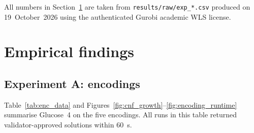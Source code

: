 \documentclass[a4paper,fleqn]{cas-sc}
\begin{document}
All numbers in Section~\ref{sec:results} are taken from \texttt{results/raw/exp\_*.csv} produced on 19~October~2026 using the authenticated Gurobi academic WLS license.

\section{Empirical findings}
\label{sec:results}

\subsection{Experiment A: encodings}
Table~\ref{tab:enc_data} and Figures~\ref{fig:cnf_growth}--\ref{fig:encoding_runtime} summarise Glucose~4 on the five encodings.
All runs in this table returned validator-approved solutions within 60~s.
\end{document}
